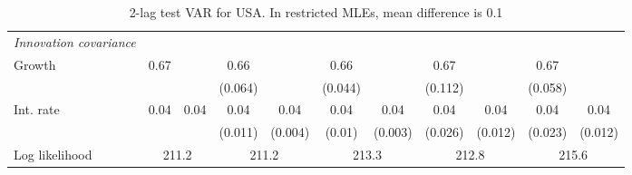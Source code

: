 \begin{table}[htbp]
\begin{tabular}{@{\extracolsep{4pt}}lcccccccccc@{}}
\rule{0pt}{4ex} \emph{Innovation covariance}  	 & 	 & 	 & 	 & 	 & 	 & 	 & 	 & 	 & 	 &\\ 
\quad Growth 	 &0.67 	 &  	 & 0.66 	 &  	 & 0.66 	 &  	 & 0.67 	 &  	 & 0.67 	 & 	 \\ 
 		 &  	 &  	 & (0.064) 	 &  	 & (0.044) 	 &  	 & (0.112) 	 &  	 & (0.058) 	 &  	 \\ 
\quad Int. rate 	 &0.04 	 & 0.04 	 & 0.04 	 & 0.04 	 & 0.04 	 & 0.04 	 & 0.04 	 & 0.04 	 & 0.04 	 & 0.04	 \\ 
 		 &  	 &  	 & (0.011) 	 & (0.004) 	 & (0.01) 	 & (0.003) 	 & (0.026) 	 & (0.012) 	 & (0.023) 	 & (0.012) 	 \\ 
 \hline \rule{0pt}{4ex} 
  Log likelihood 	 &\multicolumn{2}{c}{211.2} 	 & \multicolumn{2}{c}{211.2} 	 & \multicolumn{2}{c}{213.3} 	 & \multicolumn{2}{c}{212.8} 	 & \multicolumn{2}{c}{215.6}\\ 

 \hline 	\end{tabular}		\caption{2-lag test VAR for USA. In restricted MLEs, mean difference is 0.1}
		\label{tab:USA2lag}

\end{table}